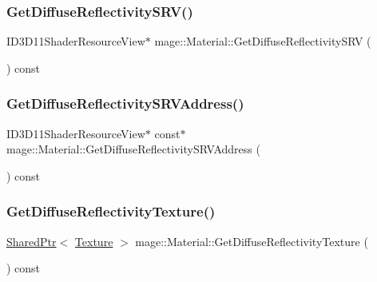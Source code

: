 \hypertarget{structmage_1_1_material_a20c4db65d5fb89178c0f6b6db2f87cda}{}\label{structmage_1_1_material_a20c4db65d5fb89178c0f6b6db2f87cda} 
\subsubsection{\texorpdfstring{Get\+Diffuse\+Reflectivity\+S\+R\+V()}{GetDiffuseReflectivitySRV()}}
{\footnotesize\ttfamily I\+D3\+D11\+Shader\+Resource\+View$\ast$ mage\+::\+Material\+::\+Get\+Diffuse\+Reflectivity\+S\+RV (\begin{DoxyParamCaption}{ }\end{DoxyParamCaption}) const\hspace{0.3cm}{\ttfamily [noexcept]}}

\hypertarget{structmage_1_1_material_a655a7349f6023b81e8d396abe06ed6ac}{}\label{structmage_1_1_material_a655a7349f6023b81e8d396abe06ed6ac} 
\subsubsection{\texorpdfstring{Get\+Diffuse\+Reflectivity\+S\+R\+V\+Address()}{GetDiffuseReflectivitySRVAddress()}}
{\footnotesize\ttfamily I\+D3\+D11\+Shader\+Resource\+View$\ast$ const$\ast$ mage\+::\+Material\+::\+Get\+Diffuse\+Reflectivity\+S\+R\+V\+Address (\begin{DoxyParamCaption}{ }\end{DoxyParamCaption}) const\hspace{0.3cm}{\ttfamily [noexcept]}}

\hypertarget{structmage_1_1_material_a3b4de7dc988c91eb3ce7ea715d98b758}{}\label{structmage_1_1_material_a3b4de7dc988c91eb3ce7ea715d98b758} 
\subsubsection{\texorpdfstring{Get\+Diffuse\+Reflectivity\+Texture()}{GetDiffuseReflectivityTexture()}}
{\footnotesize\ttfamily \hyperlink{namespacemage_a1e01ae66713838a7a67d30e44c67703e}{Shared\+Ptr}$<$ \hyperlink{classmage_1_1_texture}{Texture} $>$ mage\+::\+Material\+::\+Get\+Diffuse\+Reflectivity\+Texture (\begin{DoxyParamCaption}{ }\end{DoxyParamCaption}) const\hspace{0.3cm}{\ttfamily [noexcept]}}

